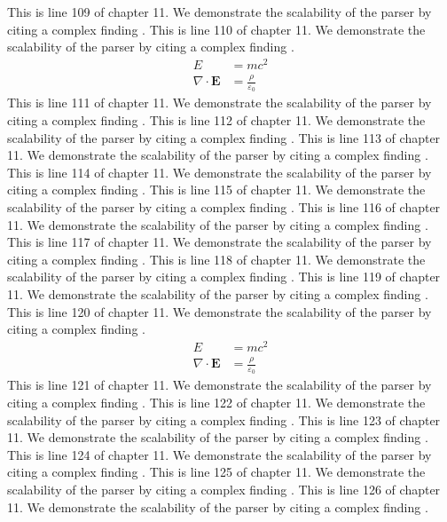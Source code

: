 This is line 109 of chapter 11. We demonstrate the scalability of the parser by citing a complex finding \cite{ref11_109}.
This is line 110 of chapter 11. We demonstrate the scalability of the parser by citing a complex finding \cite{ref11_110}.
\begin{align*}
  E &= mc^2 \\
  \nabla \cdot \mathbf{E} &= \frac{\rho}{\varepsilon_0}
\end{align*}
This is line 111 of chapter 11. We demonstrate the scalability of the parser by citing a complex finding \cite{ref11_111}.
This is line 112 of chapter 11. We demonstrate the scalability of the parser by citing a complex finding \cite{ref11_112}.
This is line 113 of chapter 11. We demonstrate the scalability of the parser by citing a complex finding \cite{ref11_113}.
This is line 114 of chapter 11. We demonstrate the scalability of the parser by citing a complex finding \cite{ref11_114}.
This is line 115 of chapter 11. We demonstrate the scalability of the parser by citing a complex finding \cite{ref11_115}.
This is line 116 of chapter 11. We demonstrate the scalability of the parser by citing a complex finding \cite{ref11_116}.
This is line 117 of chapter 11. We demonstrate the scalability of the parser by citing a complex finding \cite{ref11_117}.
This is line 118 of chapter 11. We demonstrate the scalability of the parser by citing a complex finding \cite{ref11_118}.
This is line 119 of chapter 11. We demonstrate the scalability of the parser by citing a complex finding \cite{ref11_119}.
This is line 120 of chapter 11. We demonstrate the scalability of the parser by citing a complex finding \cite{ref11_120}.
\begin{align*}
  E &= mc^2 \\
  \nabla \cdot \mathbf{E} &= \frac{\rho}{\varepsilon_0}
\end{align*}
This is line 121 of chapter 11. We demonstrate the scalability of the parser by citing a complex finding \cite{ref11_121}.
This is line 122 of chapter 11. We demonstrate the scalability of the parser by citing a complex finding \cite{ref11_122}.
This is line 123 of chapter 11. We demonstrate the scalability of the parser by citing a complex finding \cite{ref11_123}.
This is line 124 of chapter 11. We demonstrate the scalability of the parser by citing a complex finding \cite{ref11_124}.
This is line 125 of chapter 11. We demonstrate the scalability of the parser by citing a complex finding \cite{ref11_125}.
This is line 126 of chapter 11. We demonstrate the scalability of the parser by citing a complex finding \cite{ref11_126}.
